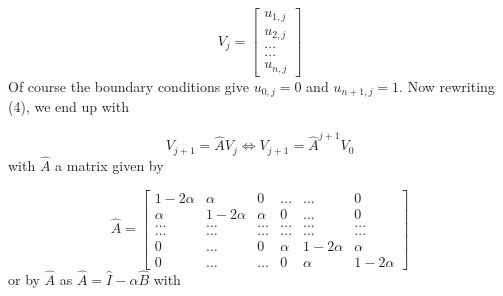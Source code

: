 \documentclass[a4paper, twoside, 11pt]{report}
\theoremstyle{theorem}
\theoremstyle{remark}
\theoremstyle{exemple}
\begin{document}
                    \begin{equation*}
                        V_j = \left[\begin{matrix}
                                        u_{1,j} \\
                                        u_{2,j} \\
                                        \dots \\
                                        \dots \\
                                        u_{n,j}
                                    \end{matrix}\right]
                    \end{equation*}
                    Of course the boundary conditions give $u_{0,j} = 0$ and $u_{n+1,j} = 1$. Now rewriting (4), we end up with

                    \begin{equation*}
                        V_{j+1}= \hat{A} V_j \Longleftrightarrow V_{j+1} = \hat{A}^{j+1}V_0
                    \end{equation*}
                    with $\hat{A}$ a matrix given by

                    \begin{equation*}
                        \hat{A} = \left[\begin{matrix}
                                          1-2\alpha & \alpha & 0 & \dots & \dots & 0\\
                                          \alpha & 1-2\alpha & \alpha & 0 & \dots & 0 \\
                                          \dots & \dots & \dots & \dots & \dots & \dots\\
                                          \dots & \dots & \dots & \dots & \dots & \dots\\
                                          0 & \dots & 0 & \alpha & 1-2\alpha & \alpha \\
                                          0 & \dots & \dots & 0 & \alpha & 1-2\alpha
                                        \end{matrix} \right]
                    \end{equation*}
                    or by $\hat{A}$ as $\hat{A}=\hat{I}- \alpha \hat{B}$ with
\end{document}

